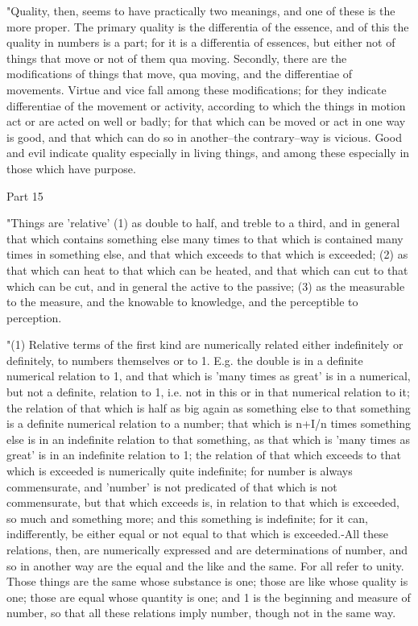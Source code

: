 "Quality, then, seems to have practically two meanings, and one of
these is the more proper. The primary quality is the differentia of
the essence, and of this the quality in numbers is a part; for it
is a differentia of essences, but either not of things that move or
not of them qua moving. Secondly, there are the modifications of things
that move, qua moving, and the differentiae of movements. Virtue and
vice fall among these modifications; for they indicate differentiae
of the movement or activity, according to which the things in motion
act or are acted on well or badly; for that which can be moved or
act in one way is good, and that which can do so in another--the contrary--way
is vicious. Good and evil indicate quality especially in living things,
and among these especially in those which have purpose. 

Part 15 

"Things are 'relative' (1) as double to half, and treble to a third,
and in general that which contains something else many times to that
which is contained many times in something else, and that which exceeds
to that which is exceeded; (2) as that which can heat to that which
can be heated, and that which can cut to that which can be cut, and
in general the active to the passive; (3) as the measurable to the
measure, and the knowable to knowledge, and the perceptible to perception.

"(1) Relative terms of the first kind are numerically related either
indefinitely or definitely, to numbers themselves or to 1. E.g. the
double is in a definite numerical relation to 1, and that which is
'many times as great' is in a numerical, but not a definite, relation
to 1, i.e. not in this or in that numerical relation to it; the relation
of that which is half as big again as something else to that something
is a definite numerical relation to a number; that which is n+I/n
times something else is in an indefinite relation to that something,
as that which is 'many times as great' is in an indefinite relation
to 1; the relation of that which exceeds to that which is exceeded
is numerically quite indefinite; for number is always commensurate,
and 'number' is not predicated of that which is not commensurate,
but that which exceeds is, in relation to that which is exceeded,
so much and something more; and this something is indefinite; for
it can, indifferently, be either equal or not equal to that which
is exceeded.-All these relations, then, are numerically expressed
and are determinations of number, and so in another way are the equal
and the like and the same. For all refer to unity. Those things are
the same whose substance is one; those are like whose quality is one;
those are equal whose quantity is one; and 1 is the beginning and
measure of number, so that all these relations imply number, though
not in the same way. 

